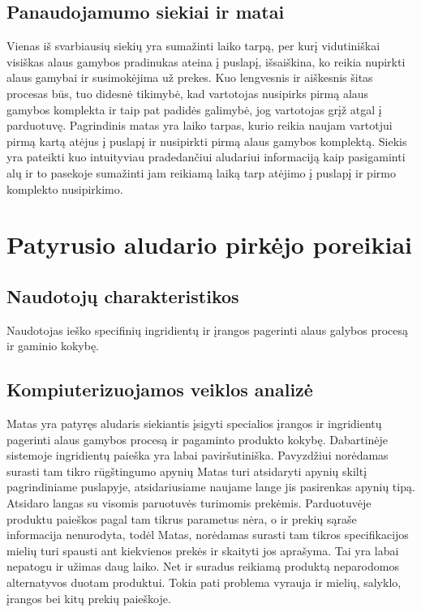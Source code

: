 \documentclass[oneside]{VUMIFPSkursinis}
\begin{document}
	\subsection{Panaudojamumo siekiai ir matai}
		Vienas iš svarbiausių siekių yra sumažinti laiko tarpą, per kurį vidutiniškai visiškas alaus gamybos pradinukas ateina į puslapį, išsaiškina, ko reikia nupirkti alaus gamybai ir susimokėjima už prekes.
		Kuo lengvesnis ir aiškesnis šitas procesas būs, tuo didesnė tikimybė, kad vartotojas nusipirks pirmą alaus gamybos komplekta ir taip pat padidės galimybė, jog vartotojas grįž atgal į parduotuvę.
		Pagrindinis matas yra laiko tarpas, kurio reikia naujam vartotjui pirmą kartą atėjus į puslapį ir nusipirkti pirmą alaus gamybos komplektą.
		Siekis yra pateikti kuo intuityviau pradedančiui aludariui informaciją kaip pasigaminti alų ir to pasekoje sumažinti jam reikiamą laiką tarp atėjimo į puslapį ir pirmo komplekto nusipirkimo.

\section{Patyrusio aludario pirkėjo poreikiai}
	\subsection{Naudotojų charakteristikos}
		Naudotojas ieško specifinių ingridientų ir įrangos pagerinti alaus galybos procesą ir gaminio kokybę.
	\subsection{Kompiuterizuojamos veiklos analizė}
		Matas yra patyręs aludaris siekiantis įsigyti specialios įrangos ir ingridientų pagerinti alaus gamybos procesą ir pagaminto produkto kokybę.
		Dabartinėje sistemoje ingridientų paieška yra labai paviršutiniška.
		Pavyzdžiui norėdamas surasti tam tikro rūgštingumo apynių Matas turi atsidaryti apynių skiltį pagrindiniame puslapyje, atsidariusiame naujame lange jis pasirenkas apynių tipą.
		Atsidaro langas su visomis paruotuvės turimomis prekėmis.
		Parduotuvėje produktu paieškos pagal tam tikrus parametus nėra, o ir prekių sąraše informacija nenurodyta, todėl Matas, norėdamas surasti tam tikros specifikacijos mielių turi spausti ant kiekvienos prekės ir skaityti jos aprašyma.
		Tai yra labai nepatogu ir užimas daug laiko.
		Net ir suradus reikiamą produktą neparodomos alternatyvos duotam produktui.
		Tokia pati problema vyrauja ir mielių, salyklo, įrangos bei kitų prekių paieškoje.
\end{document}
